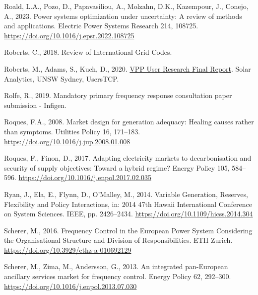 \documentclass[12pt,a4paper,]{report}
\newlength{\cslhangindent}
\newenvironment{CSLReferences}[2] %
 {%
  \setlength{\parindent}{0pt}
  \ifodd #1 \everypar{\setlength{\hangindent}{\cslhangindent}}\ignorespaces\fi
  \ifnum #2 > 0
  \setlength{\parskip}{#2\baselineskip}
  \fi
 }%
 {}
\begin{document}
\begin{CSLReferences}{1}{0}
\leavevmode{}%
Roald, L.A., Pozo, D., Papavasiliou, A., Molzahn, D.K., Kazempour, J.,
Conejo, A., 2023. Power systems optimization under uncertainty: {A}
review of methods and applications. Electric Power Systems Research 214,
108725. \url{https://doi.org/10.1016/j.epsr.2022.108725}

\leavevmode{}%
Roberts, C., 2018. Review of {International Grid Codes}.

\leavevmode{}%
Roberts, M., Adams, S., Kuch, D., 2020.
\href{https://www.ceem.unsw.edu.au/sites/default/files/uploads/publications/VPP\%20User\%20Research\%20-\%20Final\%20Report\%20-\%2020201127r.pdf}{{VPP
User Research Final Report}}. {Solar Analytics, UNSW Sydney, UsersTCP}.

\leavevmode{}%
Rolfe, R., 2019. Mandatory primary frequency response consultation paper
submission - {Infigen}.

\leavevmode{}%
Roques, F.A., 2008. Market design for generation adequacy: {Healing}
causes rather than symptoms. Utilities Policy 16, 171--183.
\url{https://doi.org/10.1016/j.jup.2008.01.008}

\leavevmode{}%
Roques, F., Finon, D., 2017. Adapting electricity markets to
decarbonisation and security of supply objectives: {Toward} a hybrid
regime? Energy Policy 105, 584--596.
\url{https://doi.org/10.1016/j.enpol.2017.02.035}

\leavevmode{}%
Ryan, J., Ela, E., Flynn, D., O'Malley, M., 2014. Variable {Generation},
{Reserves}, {Flexibility} and {Policy Interactions}, in: 2014 47th
{Hawaii International Conference} on {System Sciences}. {IEEE}, pp.
2426--2434. \url{https://doi.org/10.1109/hicss.2014.304}

\leavevmode{}%
Scherer, M., 2016. Frequency {Control} in the {European Power System
Considering} the {Organisational Structure} and {Division} of
{Responsibilities}. {ETH Zurich}.
\url{https://doi.org/10.3929/ethz-a-010692129}

\leavevmode{}%
Scherer, M., Zima, M., Andersson, G., 2013. An integrated pan-{European}
ancillary services market for frequency control. Energy Policy 62,
292--300. \url{https://doi.org/10.1016/j.enpol.2013.07.030}


\end{CSLReferences}
\end{document}
